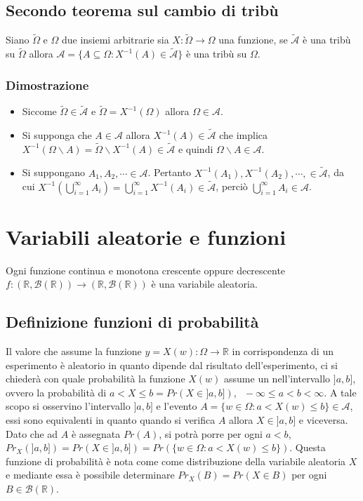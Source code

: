 \subsection{Secondo teorema sul cambio di trib\`u}
Siano $\tilde{\Omega}$ e $\Omega$ due insiemi arbitrarie  sia $X:\tilde{\Omega}\rightarrow\Omega$ una funzione, se $\tilde{\mathcal{A}}$ \`e una trib\`u su $\tilde{\Omega}$ 
allora $\mathcal{A}=\{A\subseteq\Omega: X^{-1}(A)\in\tilde{\mathcal{A}}\}$ \`e una trib\`u su $\Omega$.
\subsubsection{Dimostrazione}
\begin{itemize}
\item Siccome $\tilde{\Omega}\in\tilde{\mathcal{A}}$ e $\tilde{\Omega}=X^{-1}(\Omega)$ allora $\Omega\in\mathcal{A}$.
\item Si supponga che $A\in\mathcal{A}$ allora $X^{-1}(A)\in\tilde{\mathcal{A}}$ che implica $X^{-1}(\Omega\backslash A)=\tilde{\Omega}\backslash X^{-1}(A)\in
\tilde{\mathcal{A}}$ e quindi $\Omega\backslash A\in\mathcal{A}$.
\item Si suppongano $A_1,A_2,\cdots\in\mathcal{A}$. Pertanto $X^{-1}(A_1), X^{-1}(A_2),\cdots, \in\tilde{\mathcal{A}}$, da cui $X^{-1}(\bigcup\limits_{i=1}^\infty A_i)=\bigcup
\limits_{i=1}^\infty X^{-1}(A_i)\in\tilde{\mathcal{A}}$, perci\`o $\bigcup\limits_{i=1}^\infty A_i\in\mathcal{A}$.
\end{itemize}
\section{Variabili aleatorie e funzioni}
Ogni funzione continua e monotona crescente oppure decrescente $f:(\mathbb{R}, \mathcal{B}(\mathbb{R}))\rightarrow(\mathbb{R}, \mathcal{B}(\mathbb{R}))$ \`e una variabile 
aleatoria.
\subsection{Definizione funzioni di probabilit\`a}
Il valore che assume la funzione $y=X(w):\Omega\rightarrow\mathbb{R}$ in corrispondenza di un esperimento \`e aleatorio in quanto dipende dal risultato dell'esperimento, ci si 
chieder\`a con quale probabilit\`a la funzione $X(w)$ assume un nell'intervallo $]a,b]$, ovvero la probabilit\`a di $a<X\le b=Pr(X\in]a,b]),\;\;-\infty\le a<b<\infty$.
A tale scopo si osservino l'intervallo $]a,b]$ e l'evento $A=\{w\in\Omega: a<X(w)\le b\}\in\mathcal{A}$, essi sono equivalenti in quanto quando si verifica $A$ allora 
$X\in]a,b]$ e viceversa. Dato che ad $A$ \`e assegnata $Pr(A)$, si potr\`a porre per ogni $a<b$, $Pr_X(]a,b])=Pr(X\in]a,b])=Pr(\{w\in\Omega: a<X(w)\le b\})$. Questa funzione 
di probabilit\`a \`e nota come come distribuzione della variabile aleatoria $X$ e mediante essa \`e possibile determinare $Pr_X(B)=Pr(X\in B)$ per ogni $B\in\mathcal{B}
(\mathbb{R})$.

